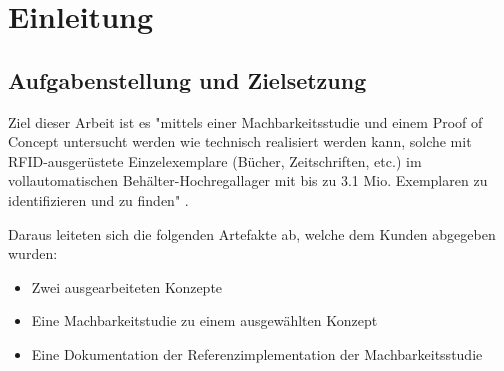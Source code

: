\chapter{Einleitung}

\section{Aufgabenstellung und Zielsetzung}
Ziel dieser Arbeit ist es "mittels einer Machbarkeitsstudie und einem Proof of Concept untersucht werden wie technisch realisiert werden kann, solche mit RFID-ausgerüstete Einzelexemplare (Bücher, Zeitschriften, etc.) im vollautomatischen Behälter-Hochregallager mit bis zu 3.1 Mio. Exemplaren zu identifizieren und zu finden" \parencite{WickiBaumann2019Projektbeschrieb}.

Daraus leiteten sich die folgenden Artefakte ab, welche dem Kunden abgegeben wurden:
\begin{itemize}
	\item Zwei ausgearbeiteten Konzepte
	\item Eine Machbarkeitstudie zu einem ausgewählten Konzept
	\item Eine Dokumentation der Referenzimplementation der Machbarkeitsstudie
\end{itemize}
